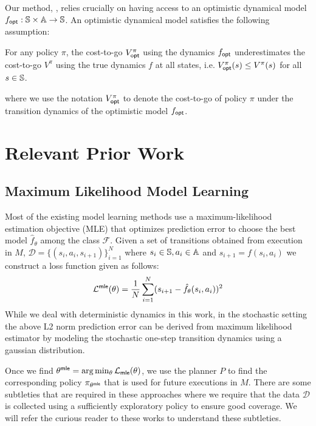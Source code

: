 Our method, \taml{}, relies crucially on having access to an
optimistic dynamical model $f_\mathsf{opt}: \mathbb{S} \times \mathbb{A}
\rightarrow \mathbb{S}$. An optimistic dynamical model satisfies
the following assumption:
\begin{assumption}
  For any policy $\pi$, the cost-to-go $V^\pi_{\mathsf{opt}}$ using the dynamics
  $f_\mathsf{opt}$ underestimates the cost-to-go $V^\pi$ using the true
  dynamics $f$ at all states, i.e. $V^\pi_{\mathsf{opt}}(s) \leq V^\pi(s)$ for
  all $s \in \mathbb{S}$.
  \label{assumption:taml-optimistic}
\end{assumption}
where we use the notation $V_{\mathsf{opt}}^\pi$ to denote the cost-to-go of
policy $\pi$ under the transition dynamics of the optimistic model
$f_\mathsf{opt}$.

\section{Relevant Prior Work}
\label{sec:prior-work}

\subsection{Maximum Likelihood Model Learning}
\label{sec:maxim-likel-model}

Most of the existing model learning methods use a maximum-likelihood
estimation objective (MLE) that optimizes prediction error to choose the best
model $\hat{f}_\theta$ among the class $\mathcal{F}$. Given a set of
transitions obtained from execution in $M$, $\mathcal{D} = \{(s_i, a_i,
s_{i+1})\}_{i=1}^N$ where $s_i \in \mathbb{S}, a_i \in \mathbb{A}$
and $s_{i+1} = f(s_i, a_i)$ we construct a loss function 
given as follows:
\begin{equation}
  \label{eq:21}
  \mathcal{L}^{\mathsf{mle}}(\theta) = \frac{1}{N} \sum_{i=1}^{N} (s_{i+1} -
  \hat{f}_\theta(s_i, a_i))^2
\end{equation}
While we deal with deterministic dynamics in this work, in the
stochastic setting the above L2 norm prediction error can be derived
from maximum likelihood estimator by modeling the stochastic one-step
transition dynamics using a gaussian distribution.

Once we find $\theta^{\mathsf{mle}} = \arg\min_{\theta}
\mathcal{L}_{\mathsf{mle}}(\theta)$, we use the planner $P$ to find the
corresponding policy $\pi_{\theta^{\mathsf{mle}}}$ that is used for future
executions in $M$. There are some subtleties that are required in
these approaches where we require that the data $\mathcal{D}$ is
collected using a sufficiently exploratory policy to ensure good
coverage. We will refer the curious reader to these works to
understand these subtleties.

